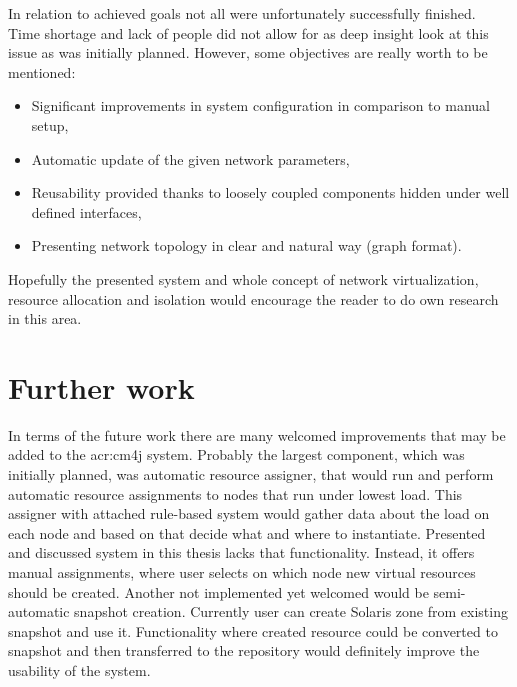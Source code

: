 \documentclass[11pt]{book}
\begin{document}
		In relation to achieved goals not all were unfortunately successfully finished. Time shortage and lack of people did not allow 
		for as deep insight look at this issue as was initially planned. However, some objectives are really worth to
		be mentioned:
	  
		\begin{itemize}
			\item Significant improvements in system configuration in comparison to manual setup,
			\item Automatic update of the given network parameters,
			\item Reusability provided thanks to loosely coupled components hidden under well defined interfaces,
			\item Presenting network topology in clear and natural way (graph format).
		\end{itemize}
		
	    Hopefully the presented system and whole concept of network virtualization, resource allocation and isolation 
	    would encourage the reader to do own research in this area.
		
    \section{Further work}
		\label{sub:sum:further}
	
	In terms of the future work there are many welcomed improvements that may be added to the \gls{acr:cm4j} system.
	Probably the largest component, which was initially planned, was automatic resource assigner, that would run and 
	perform automatic resource assignments to nodes that run under lowest load. This assigner with attached rule-based
	system would gather data about the load on each node and based on that decide what and where to instantiate. 
	Presented and discussed system in this thesis lacks that functionality. Instead, it offers manual assignments, where 
	user selects on which node new virtual resources should be created. Another not implemented yet welcomed would 
	be semi-automatic snapshot creation. Currently user can create Solaris zone from existing snapshot and use it. 
	Functionality where created resource could be converted to snapshot and then transferred to the repository would 
	definitely improve the usability of the system.


  \printglossaries

  
  
\end{document}
